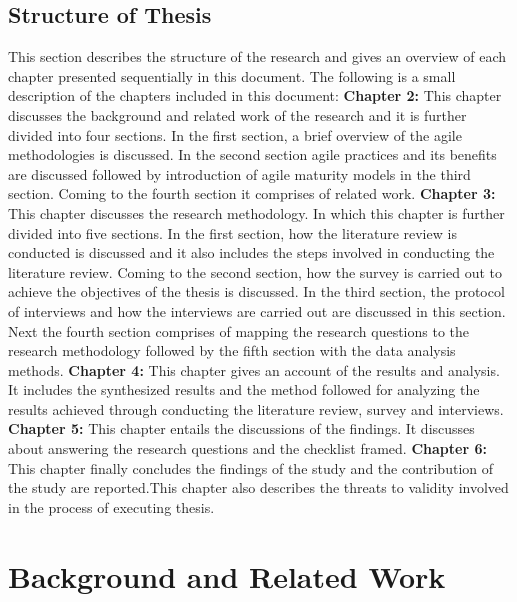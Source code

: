 \documentclass[a4paper,oneside]{bth}
\begin{document}
\section{Structure of Thesis}
This section describes the structure of the research and gives an overview of each chapter presented sequentially in this document. The following is a small description of the chapters included in this document:\newline
\textbf{Chapter 2:} This chapter discusses the background and related work of the research and it is further divided into four sections. In the first section, a brief overview of the agile methodologies is discussed. In the second section agile practices and its benefits are discussed followed by introduction of agile maturity models in the third section. Coming to the fourth section it comprises of related work.\newline
\textbf{Chapter 3:} This chapter discusses the research methodology. In which this chapter is further divided into five sections. In the first section, how the literature review is conducted is discussed and it also includes the steps involved in conducting the literature review. Coming to the second section, how the survey is carried out to achieve the objectives of the thesis is discussed. In the third section, the protocol of interviews and how the interviews are carried out are discussed in this section. Next the fourth section comprises of mapping the research questions to the research methodology followed by the fifth section with the data analysis methods.\newline
\textbf{Chapter 4:} This chapter gives an account of the results and analysis. It includes the synthesized results and the method followed for analyzing the results achieved through conducting the literature review, survey and interviews. \newline
\textbf{Chapter 5:} This chapter entails the discussions of the findings. It discusses about answering the research questions and the checklist framed. \newline
\textbf{Chapter 6:} This chapter finally concludes the findings of the study and the contribution of the study are reported.This chapter also describes the threats to validity involved in the process of executing thesis.

\chapter{Background and Related Work}
\end{document}
